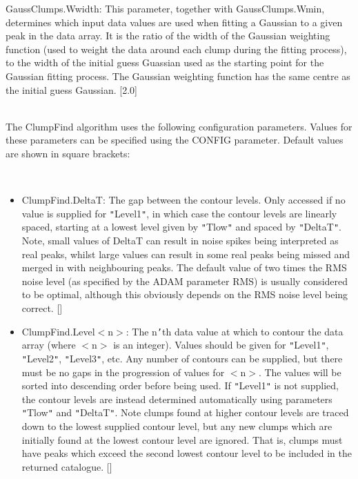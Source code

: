 \documentclass[twoside,11pt]{article}
\renewcommand{\_}{\texttt{\symbol{95}}}
\newcommand{\sstdiytopic}[2]{\item[{\hspace{-0.35em}#1\hspace{-0.35em}:}]
\mbox{} \\[1.3ex] #2}
\newcommand{\sstitemlist}[1]{
  \mbox{} \\
  \vspace{-3.5ex}
  \begin{itemize}
     #1
  \end{itemize}
}
\newcommand{\sstitem}{\item}
\newcommand{\sstdiytopic}[2]{\item[{#1}] #2 }
\newcommand{\sstitemlist}[1]{
      \begin{itemize}
         #1
      \end{itemize}
      \\
   }
\newcommand{\sstitem}{\item}
\begin{document}
{{{         \sstitem
         GaussClumps.Wwidth: This parameter, together with GaussClumps.Wmin,
         determines which input data values are used when fitting a Gaussian to
         a given peak in the data array. It is the ratio of the width of the
         Gaussian weighting function (used to weight the data around each clump
         during the fitting process), to the width of the initial guess Guassian
         used as the starting point for the Gaussian fitting process. The
         Gaussian weighting function has the same centre as the initial guess
         Gaussian. [2.0]
      }
   }
   \sstdiytopic{
      ClumpFind Configuration Parameters
   }{
      The ClumpFind algorithm uses the following configuration parameters.
      Values for these parameters can be specified using the CONFIG parameter.
      Default values are shown in square brackets:

      \sstitemlist{

         \sstitem
         ClumpFind.DeltaT: The gap between the contour levels. Only accessed
         if no value is supplied for {\tt "}Level1{\tt "}, in which case the contour levels
         are linearly spaced, starting at a lowest level given by {\tt "}Tlow{\tt "} and
         spaced by {\tt "}DeltaT{\tt "}. Note, small values of DeltaT can result in noise
         spikes being interpreted as real peaks, whilst large values can result
         in some real peaks being missed and merged in with neighbouring peaks.
         The default value of two times the RMS noise level (as specified by
         the ADAM parameter RMS) is usually considered to be optimal,
         although this obviously depends on the RMS noise level being correct. []

         \sstitem
         ClumpFind.Level$<$n$>$: The n{\tt '}th data value at which to contour the
         data array (where $<$n$>$ is an integer). Values should be given for
         {\tt "}Level1{\tt "}, {\tt "}Level2{\tt "}, {\tt "}Level3{\tt "}, etc. Any number of contours can be
         supplied, but there must be no gaps in the progression of values for
         $<$n$>$. The values will be sorted into descending order before being
         used. If {\tt "}Level1{\tt "} is not supplied, the contour levels are instead
         determined automatically using parameters {\tt "}Tlow{\tt "} and {\tt "}DeltaT{\tt "}. Note
         clumps found at higher contour levels are traced down to the lowest
         supplied contour level, but any new clumps which are initially found
         at the lowest contour level are ignored. That is, clumps must have
         peaks which exceed the second lowest contour level to be included in
         the returned catalogue. []

}}}
\end{document}
